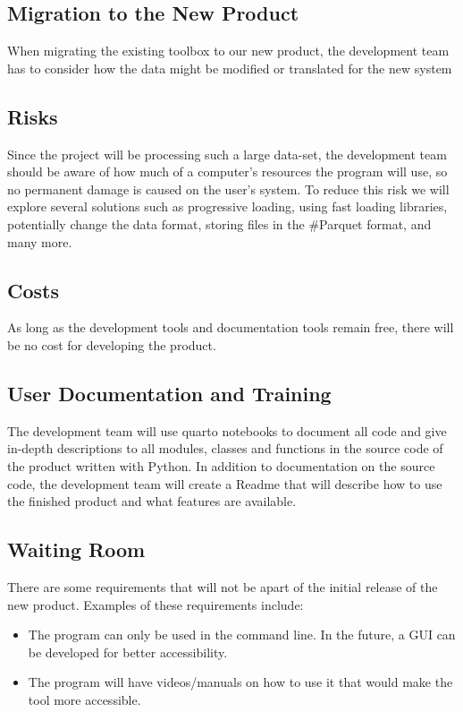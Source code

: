 \documentclass[12pt, titlepage]{article}
\begin{document}
\subsection{Migration to the New Product}
When migrating the existing toolbox to our new product, the development team has to consider how the data might be modified or translated for the new system

\subsection{Risks}
Since the project will be processing such a large data-set, the development team should be aware of how much of a computer's resources the program will use, so no permanent damage is caused on the user's system. To reduce this risk we will explore several solutions such as progressive loading, using fast loading libraries, potentially change the data format, storing files in
the \#Parquet format, and many more. 

\subsection{Costs}
As long as the development tools and documentation tools remain free, there will be no cost for developing the product.  

\subsection{User Documentation and Training}
The development team will use quarto notebooks to document all code and give in-depth descriptions to all modules, classes and functions in the source code of the product written with Python. In addition to documentation on the source code, the development team will create a Readme that will describe how to use the finished product and what features are available.

\subsection{Waiting Room}
There are some requirements that will not be apart of the initial release of the new product. Examples of these requirements include:
\begin{itemize}
    \item The program can only be used in the command line. In the future, a GUI can be developed for better accessibility.
    \item The program will have videos/manuals on how to use it that would make the tool more accessible.
\end{itemize}
\end{document}
